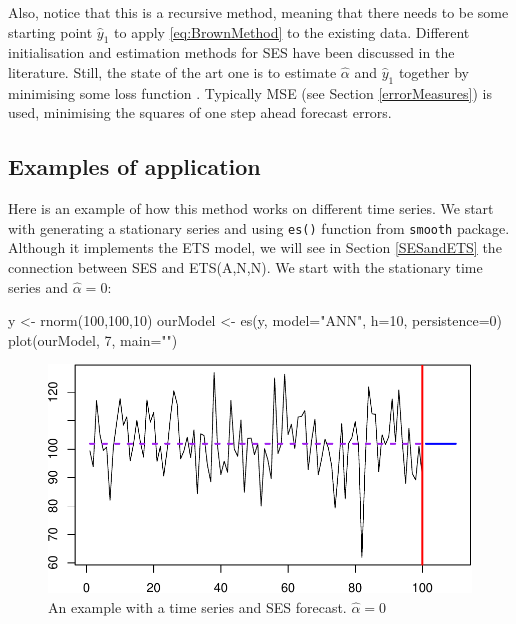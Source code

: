 \documentclass[
]{book}
\newenvironment{Shaded}{\begin{snugshade}}{\end{snugshade}}
\newcommand{\AttributeTok}[1]{\textcolor[rgb]{0.77,0.63,0.00}{#1}}
\newcommand{\DecValTok}[1]{\textcolor[rgb]{0.00,0.00,0.81}{#1}}
\newcommand{\FunctionTok}[1]{\textcolor[rgb]{0.00,0.00,0.00}{#1}}
\newcommand{\NormalTok}[1]{#1}
\newcommand{\OtherTok}[1]{\textcolor[rgb]{0.56,0.35,0.01}{#1}}
\newcommand{\StringTok}[1]{\textcolor[rgb]{0.31,0.60,0.02}{#1}}
\theoremstyle{definition}
\theoremstyle{definition}
\theoremstyle{definition}
\theoremstyle{definition}
\theoremstyle{remark}
\begin{document}
Also, notice that this is a recursive method, meaning that there needs to be some starting point \(\hat{y}_1\) to apply \eqref{eq:BrownMethod} to the existing data. Different initialisation and estimation methods for SES have been discussed in the literature. Still, the state of the art one is to estimate \(\hat{\alpha}\) and \(\hat{y}_{1}\) together by minimising some loss function \citep{Hyndman2002}. Typically MSE (see Section \ref{errorMeasures}) is used, minimising the squares of one step ahead forecast errors.

\hypertarget{examples-of-application}{%
\subsection{Examples of application}\label{examples-of-application}}

Here is an example of how this method works on different time series. We start with generating a stationary series and using \texttt{es()} function from \texttt{smooth} package. Although it implements the ETS model, we will see in Section \ref{SESandETS} the connection between SES and ETS(A,N,N). We start with the stationary time series and \(\hat{\alpha}=0\):

\begin{Shaded}
\begin{Highlighting}[]
\NormalTok{y }\OtherTok{\textless{}{-}} \FunctionTok{rnorm}\NormalTok{(}\DecValTok{100}\NormalTok{,}\DecValTok{100}\NormalTok{,}\DecValTok{10}\NormalTok{)}
\NormalTok{ourModel }\OtherTok{\textless{}{-}} \FunctionTok{es}\NormalTok{(y, }\AttributeTok{model=}\StringTok{"ANN"}\NormalTok{, }\AttributeTok{h=}\DecValTok{10}\NormalTok{, }\AttributeTok{persistence=}\DecValTok{0}\NormalTok{)}
\FunctionTok{plot}\NormalTok{(ourModel, }\DecValTok{7}\NormalTok{, }\AttributeTok{main=}\StringTok{""}\NormalTok{)}
\end{Highlighting}
\end{Shaded}

\begin{figure}
\centering
\includegraphics{Svetunkov--2022----ADAM_files/figure-latex/SESExample1-1.pdf}
\caption{\label{fig:SESExample1}An example with a time series and SES forecast. \(\hat{\alpha}=0\)}
\end{figure}
\end{document}
